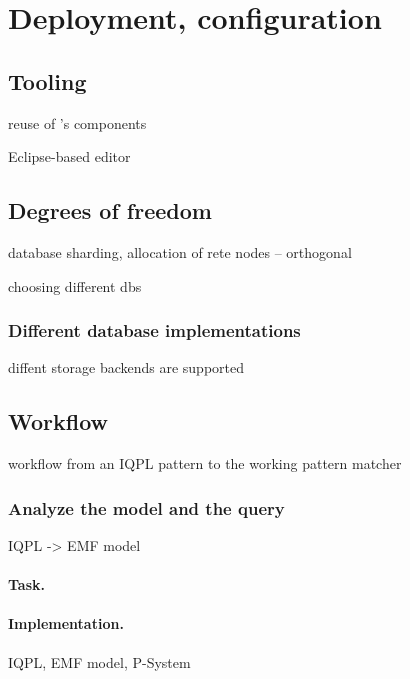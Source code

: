 \section{Deployment, configuration}
\label{sec:deployment-configuration}

\subsection{Tooling}

reuse of \eiq's components

Eclipse-based editor



\subsection{Degrees of freedom}

database sharding, allocation of rete nodes -- orthogonal

choosing different dbs

\subsubsection{Different database implementations}

diffent storage backends are supported



\subsection{Workflow}  %

workflow from an IQPL pattern to the working pattern matcher 

\subsubsection{Analyze the model and the query}

IQPL -> EMF model

\paragraph{Task.}

\paragraph{Implementation.} IQPL, EMF model, P-System 


